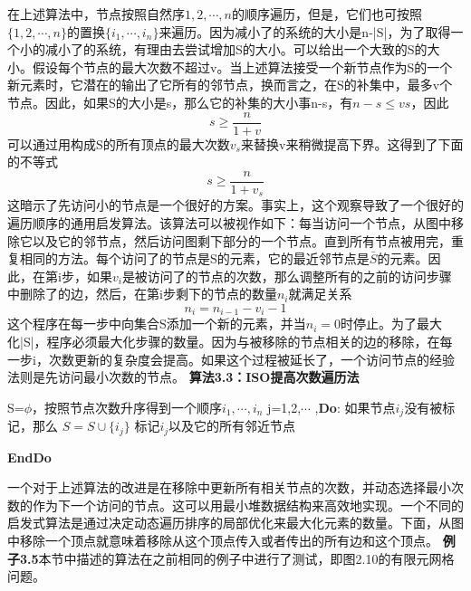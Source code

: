 \documentclass{article}
\begin{document}
在上述算法中，节点按照自然序$1,2,\cdots,n$的顺序遍历，但是，它们也可按照$\{1,2,\cdots,n\}$的置换$\{i_1,\cdots,i_n\}$来遍历。因为减小了的系统的大小是n-|S|，为了取得一个小的减小了的系统，有理由去尝试增加S的大小。可以给出一个大致的S的大小。假设每个节点的最大次数不超过v。当上述算法接受一个新节点作为S的一个新元素时，它潜在的输出了它所有的邻节点，换而言之，在S的补集中，最多v个节点。因此，如果S的大小是s，那么它的补集的大小事n-s，有$n-s\leq vs$，因此
$$s\geq \frac{n}{1+v}$$
可以通过用构成S的所有顶点的最大次数$v_s$来替换v来稍微提高下界。这得到了下面的不等式
$$s\geq \frac{n}{1+v_s}$$
这暗示了先访问小的节点是一个很好的方案。事实上，这个观察导致了一个很好的遍历顺序的通用启发算法。该算法可以被视作如下：每当访问一个节点，从图中移除它以及它的邻节点，然后访问图剩下部分的一个节点。直到所有节点被用完，重复相同的方法。每个访问了的节点是S的元素，它的最近邻节点是$\bar{S}$的元素。因此，在第i步，如果$v_i$是被访问了的节点的次数，那么调整所有的之前的访问步骤中删除了的边，然后，在第i步剩下的节点的数量$n_i$就满足关系
$$n_i=n_{i-1}-v_i-1$$
这个程序在每一步中向集合S添加一个新的元素，并当$n_i=0$时停止。为了最大化|S|，程序必须最大化步骤的数量。因为与被移除的节点相关的边的移除，在每一步i，次数更新的复杂度会提高。如果这个过程被延长了，一个访问节点的经验法则是先访问最小次数的节点。
\newline
\textbf{算法3.3：ISO提高次数遍历法}
\begin{codebox}

\li S=$\phi$，按照节点次数升序得到一个顺序$i_1,\cdots ,i_n$
\li  \For j=1,2,$\cdots$  ,\textbf{Do}: 
\li       	如果节点$i_j$没有被标记，那么
\li        	$S=S\cup \{i_ j\}$
\li            	标记$i_ j$以及它的所有邻近节点

        \End
        \li \textbf{EndDo} 
\end{codebox}
一个对于上述算法的改进是在移除中更新所有相关节点的次数，并动态选择最小次数的作为下一个访问的节点。这可以用最小堆数据结构来高效地实现。一个不同的启发式算法是通过决定动态遍历排序的局部优化来最大化元素的数量。下面，从图中移除一个顶点就意味着移除从这个顶点传入或者传出的所有边和这个顶点。
\newline
\textbf{例子3.5}本节中描述的算法在之前相同的例子中进行了测试，即图2.10的有限元网格问题。
\end{document}
